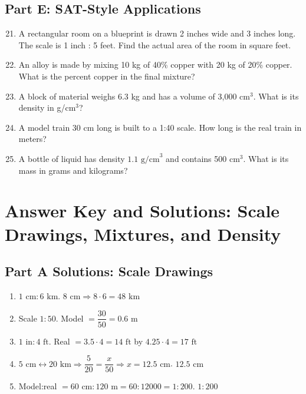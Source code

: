 \documentclass[12pt]{article}
\begin{document}
\subsection*{Part E: SAT-Style Applications}
\begin{enumerate}
  \setcounter{enumi}{20}
  \item A rectangular room on a blueprint is drawn 2 inches wide and 3 inches long. The scale is 1 inch : 5 feet. Find the actual area of the room in square feet.
  \item An alloy is made by mixing 10 kg of 40\% copper with 20 kg of 20\% copper. What is the percent copper in the final mixture?
  \item A block of material weighs 6.3 kg and has a volume of 3,000 cm\(^3\). What is its density in g/cm\(^3\)?
  \item A model train 30 cm long is built to a 1:40 scale. How long is the real train in meters?
  \item A bottle of liquid has density \(1.1\text{ g/cm}^3\) and contains 500 cm\(^3\). What is its mass in grams and kilograms?
\end{enumerate}

\newpage


\section*{Answer Key and Solutions: Scale Drawings, Mixtures, and Density}

\subsection*{Part A Solutions: Scale Drawings}
\begin{enumerate}
  \item \(1\text{ cm}:6\text{ km}\). \(8\text{ cm}\Rightarrow 8\cdot6=\boxed{48\text{ km}}\)
  \item Scale \(1:50\). Model \(=\dfrac{30}{50}=\boxed{0.6\text{ m}}\)
  \item \(1\text{ in}:4\text{ ft}\). Real \(=3.5\cdot4= \boxed{14\text{ ft}}\) by \(4.25\cdot4=\boxed{17\text{ ft}}\)
  \item \(5\text{ cm}\leftrightarrow 20\text{ km}\Rightarrow \dfrac{5}{20}=\dfrac{x}{50}\Rightarrow x=12.5\text{ cm}\). \(\boxed{12.5\text{ cm}}\)
  \item Model:real \(=60\text{ cm}:120\text{ m}=60:12000=1:200\). \(\boxed{1:200}\)
\end{enumerate}
\end{document}
